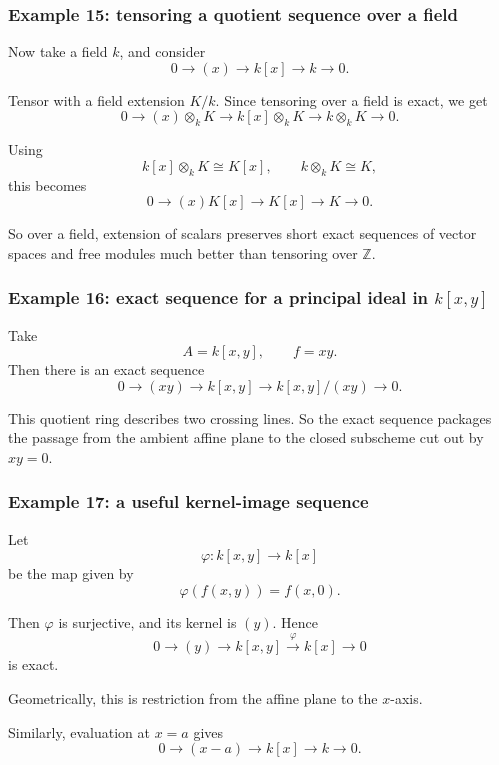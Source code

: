 \documentclass[12pt,a4paper]{article}
\theoremstyle{notespace}
\theoremstyle{definition}
\begin{document}
\subsubsection{Example 15: tensoring a quotient sequence over a field}

Now take a field \(k\), and consider
\[
0 \longrightarrow (x) \longrightarrow k[x] \longrightarrow k \longrightarrow 0.
\]

Tensor with a field extension \(K/k\). Since tensoring over a field is exact, we get
\[
0 \longrightarrow (x)\otimes_k K \longrightarrow k[x]\otimes_k K \longrightarrow k\otimes_k K \longrightarrow 0.
\]

Using
\[
k[x]\otimes_k K \cong K[x],
\qquad
k\otimes_k K \cong K,
\]
this becomes
\[
0 \longrightarrow (x)K[x] \longrightarrow K[x] \longrightarrow K \longrightarrow 0.
\]

So over a field, extension of scalars preserves short exact sequences of vector spaces and free modules much better than tensoring over \(\mathbb Z\).

\subsubsection{Example 16: exact sequence for a principal ideal in \(k[x,y]\)}

Take
\[
A=k[x,y],
\qquad
f=xy.
\]
Then there is an exact sequence
\[
0 \longrightarrow (xy) \longrightarrow k[x,y] \longrightarrow k[x,y]/(xy) \longrightarrow 0.
\]

This quotient ring describes two crossing lines.  
So the exact sequence packages the passage from the ambient affine plane to the closed subscheme cut out by \(xy=0\).

\subsubsection{Example 17: a useful kernel-image sequence}

Let
\[
\varphi:k[x,y]\longrightarrow k[x]
\]
be the map given by
\[
\varphi(f(x,y))=f(x,0).
\]

Then \(\varphi\) is surjective, and its kernel is \((y)\). Hence
\[
0 \longrightarrow (y) \longrightarrow k[x,y] \xrightarrow{\varphi} k[x] \longrightarrow 0
\]
is exact.

Geometrically, this is restriction from the affine plane to the \(x\)-axis.

Similarly, evaluation at \(x=a\) gives
\[
0 \longrightarrow (x-a) \longrightarrow k[x] \longrightarrow k \longrightarrow 0.
\]
\end{document}
